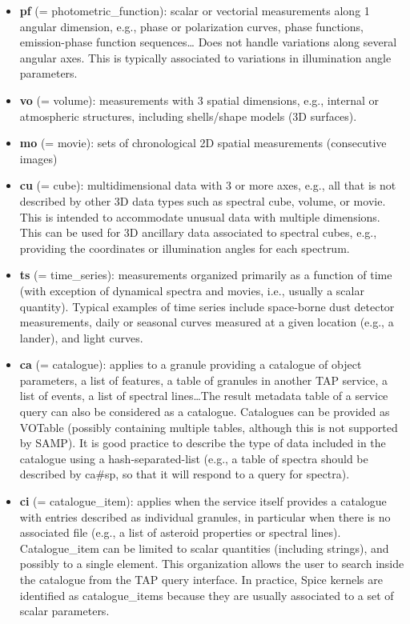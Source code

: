 \documentclass[11pt,a4paper]{ivoa}
\begin{document}
\begin{itemize}
\item \textbf{pf }(= photometric\_function): scalar or vectorial
measurements along 1 angular dimension, e.g., phase or polarization
curves, phase functions, emission-phase function sequences… Does not
handle variations along several angular axes. This is typically associated
to variations in illumination angle parameters.

\item \textbf{vo }(= volume): measurements with 3 spatial dimensions,
e.g., internal or atmospheric structures, including shells/shape models
(3D surfaces).

\item \textbf{mo }(= movie): sets of chronological 2D spatial measurements
(consecutive images)

\item \textbf{cu }(= cube): multidimensional data with 3 or more axes,
e.g., all that is not described by other 3D data types such as spectral
cube, volume, or movie. This is intended to accommodate unusual data with multiple
dimensions. This can be used for 3D ancillary data associated to spectral
cubes, e.g., providing the coordinates or illumination angles for
each spectrum.

\item \textbf{ts }(= time\_series): measurements organized primarily
as a function of time (with exception of dynamical spectra and movies,
i.e., usually a scalar quantity). Typical examples of time series include
space-borne dust detector measurements, daily or seasonal curves measured
at a given location (e.g., a lander), and light curves.

\item \textbf{ca }(= catalogue): applies to a granule providing a
catalogue of object parameters, a list of features, a table of granules
in another TAP service, a list of events, a list of spectral lines\dots The
result metadata table of a service query can also be considered as a
catalogue. Catalogues can be provided as VOTable (possibly containing
multiple tables, although this is not supported by SAMP). It is good
practice to describe the type of data included in the catalogue using
a hash-separated-list (e.g., a table of spectra should be described by
ca\#sp, so that it will respond to a query for spectra).

\item \textbf{ci }(= catalogue\_item): applies when the service itself
provides a catalogue with entries described as individual granules, in
particular when there is no associated file (e.g., a list of asteroid
properties or spectral lines). Catalogue\_item can be limited to scalar
quantities (including strings), and possibly to a single element. This
organization allows the user to search inside the catalogue from
the TAP query interface. In practice, Spice kernels are identified as
catalogue\_items because they are usually associated to a set of scalar
parameters.


\end{itemize}
\end{document}
